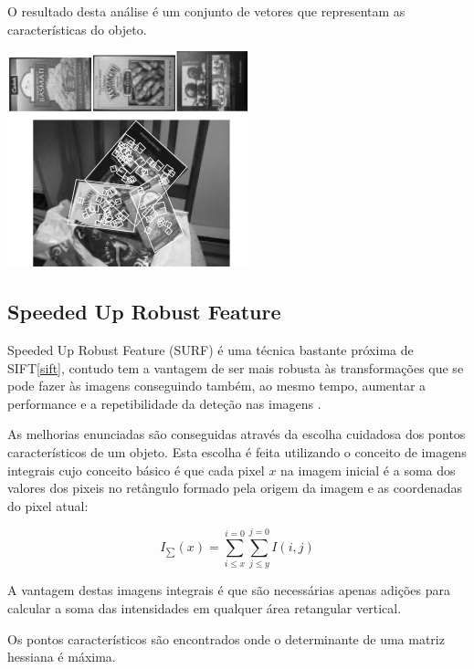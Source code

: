 O resultado desta análise é um conjunto de vetores que representam as características do objeto.


\begin{center}
	\includegraphics[scale=1.00]{figures/sift_img.png}
	\label{fig:sift}
\end{center}

\subsection[SURF]{Speeded Up Robust Feature}

Speeded Up Robust Feature (SURF) é uma técnica bastante próxima de SIFT\ref{sift}, contudo tem a vantagem de ser mais robusta às transformações que se pode fazer às imagens conseguindo também, ao mesmo tempo, aumentar a performance e a repetibilidade da deteção nas imagens \cite{citeulike:973069}.

As melhorias enunciadas são conseguidas através da escolha cuidadosa dos pontos característicos de um objeto. Esta escolha é feita utilizando o conceito de imagens integrais \cite{10.1109CVPR.2001.990517} cujo conceito básico é que cada pixel $x$ na imagem inicial é a soma dos valores dos pixeis no retângulo formado pela origem da imagem e as coordenadas do pixel atual:

\begin{equation}
I_\sum(x) = \sum_{i \leq x}^{i=0} \sum_{j \leq y}^{j=0} I(i,j)
\end{equation}


A vantagem destas imagens integrais é que são necessárias apenas adições para calcular a soma das intensidades em qualquer área retangular vertical.

Os pontos característicos são encontrados onde o determinante de uma matriz hessiana é máxima.


